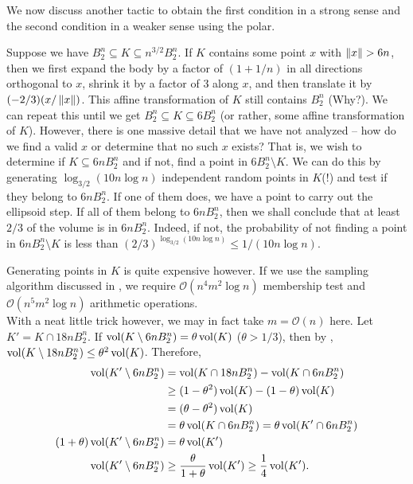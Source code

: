 We now discuss another tactic to obtain the first condition in a strong sense and the second condition in a weaker sense using the polar.

Suppose we have $B_2^n\subseteq K\subseteq n^{3/2}B_2^n$. If $K$ contains some point $x$ with $\left\lVert x\right\rVert>6n$, then we first expand the body by a factor of $(1+1/n)$ in all directions orthogonal to $x$, shrink it by a factor of $3$ along $x$, and then translate it by $(-2/3)(x/\left\lVert x\right\rVert)$. This affine transformation of $K$ still contains $B_2^n$ (Why?). We can repeat this until we get $B_2^n\subseteq K\subseteq 6B_2^n$ (or rather, some affine transformation of $K$). However, there is one massive detail that we have not analyzed -- how do we find a valid $x$ or determine that no such $x$ exists? That is, we wish to determine if $K\subseteq 6nB_2^n$ and if not, find a point in $6B_2^n\setminus K$. We can do this by generating $\log_{3/2} (10n\log n)$ independent random points in $K$(!) and test if they belong to $6nB_2^n$. If one of them does, we have a point to carry out the ellipsoid step. If all of them belong to $6nB_2^n$, then we shall conclude that at least $2/3$ of the volume is in $6nB_2^n$. Indeed, if not, the probability of not finding a point in $6nB_2^n\setminus K$ is less than $(2/3)^{\log_{3/2} (10n\log n)} \leq 1/(10n\log n)$.

Generating points in $K$ is quite expensive however. If we use the sampling algorithm discussed in , we require $\mathcal{O}(n^4 m^2 \log n)$ membership test and $\mathcal{O}(n^5 m^2 \log n)$ arithmetic operations.\\
With a neat little trick however, we may in fact take $m=\mathcal{O}(n)$ here. Let $K'=K\cap 18n B_2^n$. If $\operatorname{vol}(K\setminus 6nB_2^n)=\theta\operatorname{vol}(K)$ ($\theta>1/3$), then by , $\operatorname{vol}(K\setminus 18nB_2^n)\leq\theta^2\operatorname{vol}(K)$. Therefore,
\begin{align*}
	\operatorname{vol}(K'\setminus 6nB_2^n) &= \operatorname{vol}(K\cap 18nB_2^n) - \operatorname{vol}(K\cap 6nB_2^n) \\
		&\geq (1-\theta^2)\operatorname{vol}(K) - (1-\theta)\operatorname{vol}(K) \\
		&= (\theta-\theta^2)\operatorname{vol}(K) \\
		&= \theta\operatorname{vol}(K\cap 6nB_2^n) = \theta\operatorname{vol}(K'\cap 6nB_2^n) \\
	(1+\theta)\operatorname{vol}(K'\setminus 6nB_2^n) &= \theta\operatorname{vol}(K') \\
	\operatorname{vol}(K'\setminus 6nB_2^n) &\geq \frac{\theta}{1+\theta} \operatorname{vol}(K') \geq \frac{1}{4} \operatorname{vol}(K').
\end{align*}

